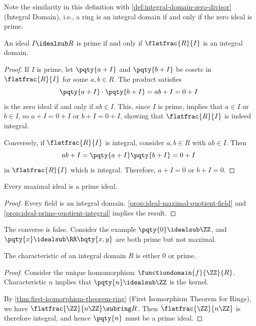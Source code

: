 Note the similarity in this definition with \autoref{def:integral-domain-zero-divisor} (Integral Domain), i.e., a ring is an integral domain if and only if the zero ideal is prime.

\begin{proposition}
    \label{prop:ideal-prime-quotient-integral}%
    An ideal \(I \idealsub R\) is prime if and only if \(\flatfrac{R}{I}\) is an integral domain.
\end{proposition}

\begin{proof}
    If \(I\) is prime, let \(\pqty{a + I}\) and \(\pqty{b + I}\) be cosets in \(\flatfrac{R}{I}\) for some \(a, b \in R\). The product satisfies
    \[
        \pqty{a + I} \cdot \pqty{b + I} = ab + I = 0 + I
    \]
    is the zero ideal if and only if \(ab \in I\). This, since \(I\) is prime, implies that \(a \in I\) or \(b \in I\), so \(a + I = 0 + I\) or \(b + I = 0 + I\), showing that \(\flatfrac{R}{I}\) is indeed integral.

    Conversely, if \(\flatfrac{R}{I}\) is integral, consider \(a, b \in R\) with \(ab \in I\). Then
    \[
        ab + I = \pqty{a + I} \pqty{b + I} = 0 + I
    \]
    in \(\flatfrac{R}{I}\) which is integral. Therefore, \(a + I = 0\) or \(b + I = 0\).
\end{proof}

\begin{proposition}
    \label{prop:maximal-ideal-prime}%
    Every maximal ideal is a prime ideal.
\end{proposition}

\begin{proof}
    Every field is an integral domain. \autoref{prop:ideal-maximal-quotient-field} and \autoref{prop:ideal-prime-quotient-integral} implies the result.
\end{proof}

\begin{remark}
    The converse is false. Consider the example \(\pqty{0} \idealsub \ZZ\), and \(\pqty{x} \idealsub \RR\bqty{x, y}\) are both prime but not maximal.
\end{remark}

\begin{proposition}
    \label{prop:characteristic-integral-domain}%
    The characteristic of an integral domain \(R\) is either \(0\) or prime.
\end{proposition}

\begin{proof}
    Consider the unique homomorphism \(\functiondomain{f}{{\ZZ}}{R}\). Characteristic \(n\) implies that \(\pqty{n} \idealsub \ZZ\) is the kernel.

    By \autoref{thm:first-isomorphism-theorem-ring} (First Isomorphism Theorem for Rings), we have \(\flatfrac{\ZZ}{n\ZZ} \subring R\). Then \(\flatfrac{\ZZ}{n\ZZ}\) is therefore integral, and hence \(\pqty{n}\) must be a prime ideal.
\end{proof}